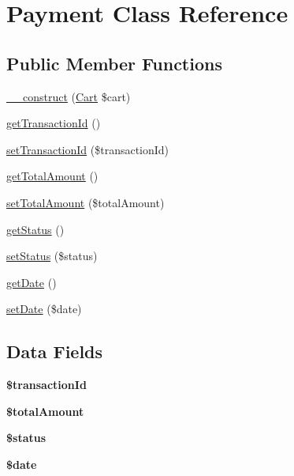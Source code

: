 \hypertarget{class_payment}{\section{Payment Class Reference}
\label{class_payment}
}
\subsection*{Public Member Functions}
\begin{DoxyCompactItemize}
\item 
\hyperlink{class_payment_a2d53d5d99a547c3ed6be0c04748f9e1d}{\+\_\+\+\_\+construct} (\hyperlink{class_cart}{Cart} \$cart)
\item 
\hyperlink{class_payment_a83a4c2954e4da6dad24e596265e33d0a}{get\+Transaction\+Id} ()
\item 
\hyperlink{class_payment_afdfe179c06dfde891b92f8f93daa8bb6}{set\+Transaction\+Id} (\$transaction\+Id)
\item 
\hyperlink{class_payment_ae305b3e3acedd1fa9854e72f83af22c1}{get\+Total\+Amount} ()
\item 
\hyperlink{class_payment_a56860f621c6e6e47042e41fa4e59d13b}{set\+Total\+Amount} (\$total\+Amount)
\item 
\hyperlink{class_payment_a9d21636071f529e2154051d3ea6e5921}{get\+Status} ()
\item 
\hyperlink{class_payment_a7d02c100d684fe1dffc6cb3486a48511}{set\+Status} (\$status)
\item 
\hyperlink{class_payment_a24d89b0ad05ea2e33626b1fc8ed59bc3}{get\+Date} ()
\item 
\hyperlink{class_payment_a2570e83b20f9be514f22e3fd0b7c0d17}{set\+Date} (\$date)
\end{DoxyCompactItemize}
\subsection*{Data Fields}
\begin{DoxyCompactItemize}
\item 
\hypertarget{class_payment_ad140126bd86738fe3e0c2f61d2a4f512}{{\bfseries \$transaction\+Id}}\label{class_payment_ad140126bd86738fe3e0c2f61d2a4f512}

\item 
\hypertarget{class_payment_a3e0c1774fd1d5e4ab64b8b06d9cdc327}{{\bfseries \$total\+Amount}}\label{class_payment_a3e0c1774fd1d5e4ab64b8b06d9cdc327}

\item 
\hypertarget{class_payment_a58391ea75f2d29d5d708d7050b641c33}{{\bfseries \$status}}\label{class_payment_a58391ea75f2d29d5d708d7050b641c33}

\item 
\hypertarget{class_payment_a481c918f8d853749e00b5942cabf599a}{{\bfseries \$date}}\label{class_payment_a481c918f8d853749e00b5942cabf599a}

\end{DoxyCompactItemize}


